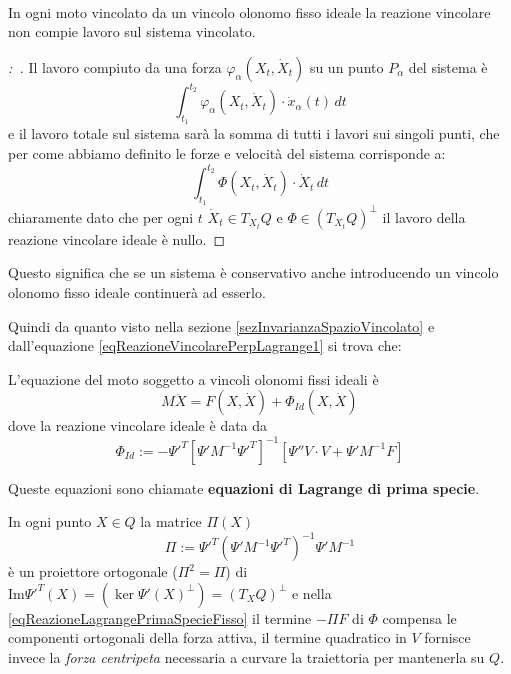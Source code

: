 \documentclass[11pt,a4paper,twoside]{book}
\newenvironment{proposizione}[1][\empty]{\begin{Proposizione}{
\ifx\empty#1\relax\else\mdseries\itshape#1\\\fi
}{}}{\end{Proposizione}}
\newenvironment{importante}[0]{ 
  \begin{center}\begin{tcolorbox}[enhanced,
  before skip=2mm,after skip=3mm,
  boxrule=0.4pt,left=5mm,right=2mm,top=1mm,bottom=1mm,
  colback=yellow!50,
  colframe=yellow!20!black,
  sharp corners,arc=3mm,
  underlay={
  	\path[fill=red!50!black,draw=none] (interior.south west) rectangle 			node[white]{\Huge\bfseries !} ([xshift=4mm]interior.north west);
  },
  drop fuzzy shadow]
  }{
 \normalsize \end{tcolorbox}\end{center}
}
\newenvironment{dimo}[1][\proofname]{
	\begin{tcolorbox}[
	breakable, 
	enhanced, 
	interior hidden, 
	frame hidden, 
	borderline west = {1pt}{0pt}{gray}, 
	top=0pt, bottom=0pt, left=0pt]
\begin{proof}[#1:~]
}
{
\end{proof}
\end{tcolorbox}
}
\theoremstyle{esss}
\theoremstyle{dotless}
\numberwithin{equation}{section} %
\begin{document}
\begin{proposizione}
In ogni moto vincolato da un vincolo olonomo fisso ideale la reazione vincolare non compie lavoro sul sistema vincolato.
\end{proposizione}
\begin{dimo}
Il lavoro compiuto da una forza $\varphi_\alpha(X_t,\dot{X}_t)$ su un punto $P_\alpha$ del sistema è
\[
\int_{t_1}^{t_2} \varphi_\alpha(X_t,\dot{X}_t) \cdot \dot{x}_\alpha(t) \, dt
\]
e il lavoro totale sul sistema sarà la somma di tutti i lavori sui singoli punti, che per come abbiamo definito le forze e velocità del sistema corrisponde a:
\[
\int_{t_1}^{t_2} \Phi(X_t,\dot{X}_t)\cdot\dot{X}_t \, dt
\]
chiaramente dato che per ogni $t$ $\dot{X}_t\in T_{X_t}Q$ e $\Phi\in \left(T_{X_t}Q\right)^\perp$ il lavoro della reazione vincolare ideale è nullo.
\end{dimo}

Questo significa che se un sistema è conservativo anche introducendo un vincolo olonomo fisso ideale continuerà ad esserlo.

Quindi da quanto visto nella sezione \ref{sezInvarianzaSpazioVincolato} e dall'equazione \eqref{eqReazioneVincolarePerpLagrange1} si trova che:
\begin{importante}
L'equazione del moto soggetto a vincoli olonomi fissi ideali è
\begin{equation}\label{eqLagrangePrimaSpecieFisso}
M\ddot{X}=F(X,\dot{X})+\Phi_{Id}(X,\dot{X})
\end{equation}
dove la reazione vincolare ideale è data da
\begin{equation}\label{eqReazioneLagrangePrimaSpecieFisso}
\Phi_{Id}:=-\Psi'^T\left[ \Psi' M^{-1} \Psi'^T \right]^{-1} \left[ \Psi'' V\cdot V+\Psi' M^{-1}F \right] 
\end{equation}
\end{importante}

Queste equazioni sono chiamate \textbf{equazioni di Lagrange di prima specie}.

In ogni punto $X\in Q$ la matrice $\Pi(X)$
\[
\Pi:=\Psi'^T\left( \Psi'M^{-1}\Psi'^T \right)^{-1}\Psi'M^{-1}
\]
è un proiettore ortogonale ($\Pi^2=\Pi$) di $\text{Im}\Psi'^T(X)=\left(\ker{\Psi'(X)}^\perp\right)=(T_XQ)^\perp$ e nella \eqref{eqReazioneLagrangePrimaSpecieFisso} il termine $-\Pi F$ di $\Phi$ compensa le componenti ortogonali della forza attiva, il termine quadratico in $V$ fornisce invece la \textit{forza centripeta} necessaria a curvare la traiettoria per mantenerla su $Q$.
\end{document}
